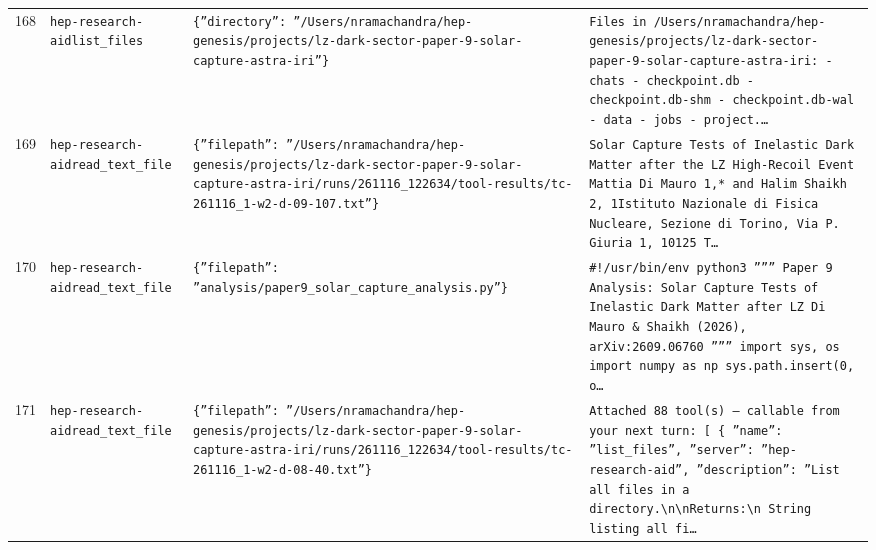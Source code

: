 \documentclass[11pt,a4paper]{article}
\begin{document}
\begin{longtable}{@{}p{}p{}p{}p{}@{}}
168 & \texttt{hep-research-aid}\newline\texttt{list\_\allowbreak{}files} & \texttt{\{''directory'':\allowbreak{} ''/\allowbreak{}Users/\allowbreak{}nramachandra/\allowbreak{}hep-genesis/\allowbreak{}projects/\allowbreak{}lz-dark-sector-paper-9-solar-capture-astra-iri''\}\allowbreak{}} & \texttt{Files in /\allowbreak{}Users/\allowbreak{}nramachandra/\allowbreak{}hep-genesis/\allowbreak{}projects/\allowbreak{}lz-dark-sector-paper-9-solar-capture-astra-iri:\allowbreak{}   - chats   - checkpoint.db   - checkpoint.db-shm   - checkpoint.db-wal   - data   - jobs   - project.\ldots{}\allowbreak{}} \\
169 & \texttt{hep-research-aid}\newline\texttt{read\_\allowbreak{}text\_\allowbreak{}file} & \texttt{\{''filepath'':\allowbreak{} ''/\allowbreak{}Users/\allowbreak{}nramachandra/\allowbreak{}hep-genesis/\allowbreak{}projects/\allowbreak{}lz-dark-sector-paper-9-solar-capture-astra-iri/\allowbreak{}runs/\allowbreak{}261116\_\allowbreak{}122634/\allowbreak{}tool-results/\allowbreak{}tc-261116\_\allowbreak{}1-w2-d-09-107.txt''\}\allowbreak{}} & \texttt{Solar Capture Tests of Inelastic Dark Matter after the LZ High-Recoil Event Mattia Di Mauro 1,\allowbreak{}* and Halim Shaikh 2,\allowbreak{}\dag{}\allowbreak{} 1Istituto Nazionale di Fisica Nucleare,\allowbreak{} Sezione di Torino,\allowbreak{} Via P. Giuria 1,\allowbreak{} 10125 T\ldots{}\allowbreak{}} \\
170 & \texttt{hep-research-aid}\newline\texttt{read\_\allowbreak{}text\_\allowbreak{}file} & \texttt{\{''filepath'':\allowbreak{} ''analysis/\allowbreak{}paper9\_\allowbreak{}solar\_\allowbreak{}capture\_\allowbreak{}analysis.py''\}\allowbreak{}} & \texttt{\#!/\allowbreak{}usr/\allowbreak{}bin/\allowbreak{}env python3 '''''' Paper 9 Analysis:\allowbreak{} Solar Capture Tests of Inelastic Dark Matter after LZ Di Mauro \& Shaikh (2026)\allowbreak{},\allowbreak{} arXiv:\allowbreak{}2609.06760 '''''' import sys,\allowbreak{} os import numpy as np sys.path.insert(0,\allowbreak{} o\ldots{}\allowbreak{}} \\
171 & \texttt{hep-research-aid}\newline\texttt{read\_\allowbreak{}text\_\allowbreak{}file} & \texttt{\{''filepath'':\allowbreak{} ''/\allowbreak{}Users/\allowbreak{}nramachandra/\allowbreak{}hep-genesis/\allowbreak{}projects/\allowbreak{}lz-dark-sector-paper-9-solar-capture-astra-iri/\allowbreak{}runs/\allowbreak{}261116\_\allowbreak{}122634/\allowbreak{}tool-results/\allowbreak{}tc-261116\_\allowbreak{}1-w2-d-08-40.txt''\}\allowbreak{}} & \texttt{Attached 88 tool(s)\allowbreak{} --- callable from your next turn:\allowbreak{} [  \{   ''name'':\allowbreak{} ''list\_\allowbreak{}files'',\allowbreak{}   ''server'':\allowbreak{} ''hep-research-aid'',\allowbreak{}   ''description'':\allowbreak{} ''List all files in a directory.\textbackslash{}\allowbreak{}n\textbackslash{}\allowbreak{}nReturns:\allowbreak{}\textbackslash{}\allowbreak{}n    String listing all fi\ldots{}\allowbreak{}} \\

\end{longtable}
\end{document}
